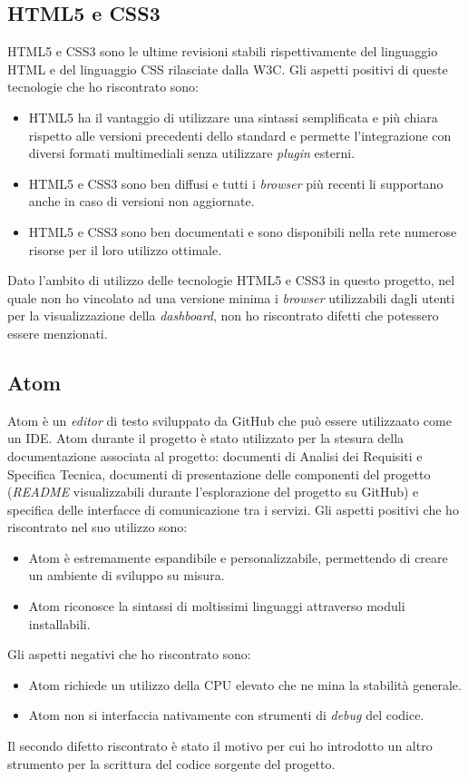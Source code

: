 \subsection{HTML5 e CSS3}

HTML5 e CSS3 sono le ultime revisioni stabili rispettivamente del linguaggio HTML e del linguaggio CSS rilasciate dalla W3C.
Gli aspetti positivi di queste tecnologie che ho riscontrato sono:
\begin{itemize}
	\item HTML5 ha il vantaggio di utilizzare una sintassi semplificata e più chiara rispetto alle versioni precedenti dello standard e permette l’integrazione con diversi formati multimediali senza utilizzare \emph{plugin} esterni.
	\item HTML5 e CSS3 sono ben diffusi e tutti i \emph{browser} più recenti li supportano anche in caso di versioni non aggiornate.
	\item HTML5 e CSS3 sono ben documentati e sono disponibili nella rete numerose risorse per il loro utilizzo ottimale.
\end{itemize}
Dato l'ambito di utilizzo delle tecnologie HTML5 e CSS3 in questo progetto, nel quale non ho vincolato ad una versione minima i \emph{browser} utilizzabili dagli utenti per la visualizzazione della \emph{dashboard}, non ho riscontrato difetti che potessero essere menzionati.

\subsection{Atom}
\label{subsec:atom}

Atom è un \emph{editor} di testo sviluppato da GitHub che può essere utilizzaato come un \gls{IDE}.
Atom durante il progetto è stato utilizzato per la stesura della documentazione associata al progetto: documenti di Analisi dei Requisiti e Specifica Tecnica, documenti di presentazione delle componenti del progetto (\emph{README} visualizzabili durante l'esplorazione del progetto su GitHub) e specifica delle interfacce di comunicazione tra i servizi.
Gli aspetti positivi che ho riscontrato nel suo utilizzo sono:
\begin{itemize}
	\item Atom è estremamente espandibile e personalizzabile, permettendo di creare un ambiente di sviluppo su misura.
	\item Atom riconosce la sintassi di moltissimi linguaggi attraverso moduli installabili.
\end{itemize}
Gli aspetti negativi che ho riscontrato sono:
\begin{itemize}
	\item Atom richiede un utilizzo della CPU elevato che ne mina la stabilità generale.
	\item Atom non si interfaccia nativamente con strumenti di \emph{debug} del codice.
\end{itemize}
Il secondo difetto riscontrato è stato il motivo per cui ho introdotto un altro strumento per la scrittura del codice sorgente del progetto.

